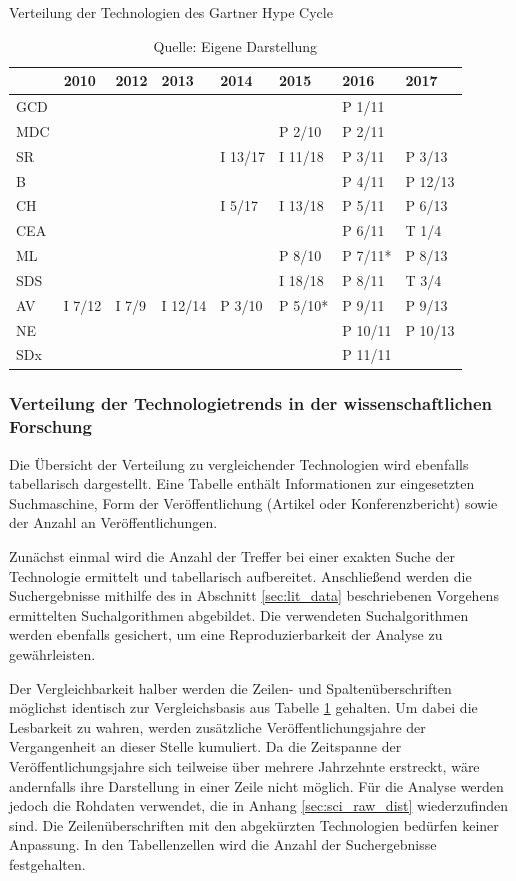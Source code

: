 \begin{table}
	\caption{Verteilung der Technologien des \glqq Gartner Hype Cycle\grqq}
	\centering
	\label{tab:dist_ghc}
\begin{tabularx}{\linewidth}{X|XXXXXXX}
	& 2010 & 2012 & 2013 & 2014 & 2015 & 2016 & 2017 \\
	\hline
	GCD &  &  &  &  &  & P 1/11 &  \\
	\hline
	MDC &  &  &  &  & P 2/10 & P 2/11 &  \\
	\hline
	SR &  &  &  & I 13/17 & I 11/18 & P 3/11 & P 3/13 \\
	\hline
	B &  &  &  &  &  & P 4/11 & P 12/13 \\
	\hline
	CH &  &  &  & I 5/17 & I 13/18 & P 5/11 & P 6/13 \\
	\hline
	CEA &  &  &  &  &  & P 6/11 & T 1/4 \\
	\hline
	ML &  &  &  &  & P 8/10 & P 7/11* & P 8/13 \\
	\hline
	SDS &  &  &  &  & I 18/18 & P 8/11 & T 3/4 \\
	\hline
	AV & I 7/12 & I 7/9 & I 12/14 & P 3/10 & P 5/10* & P 9/11 & P 9/13 \\
	\hline
	NE &  &  &  &  &  & P 10/11 & P 10/13 \\
	\hline
	SDx &  &  &  &  &  & P 11/11 &  \\
\end{tabularx}
\caption*{Quelle: Eigene Darstellung}
\end{table}

\subsubsection{Verteilung der Technologietrends in der wissenschaftlichen Forschung}
Die Übersicht der Verteilung zu vergleichender Technologien wird ebenfalls tabellarisch dargestellt. Eine Tabelle enthält Informationen zur eingesetzten Suchmaschine, Form der Veröffentlichung (Artikel oder Konferenzbericht) sowie der Anzahl an Veröffentlichungen.

Zunächst einmal wird die Anzahl der Treffer bei einer exakten Suche der Technologie ermittelt und tabellarisch aufbereitet. Anschließend werden die Suchergebnisse mithilfe des in Abschnitt \ref{sec:lit_data} beschriebenen Vorgehens ermittelten Suchalgorithmen abgebildet. Die verwendeten Suchalgorithmen werden ebenfalls gesichert, um eine Reproduzierbarkeit der Analyse zu gewährleisten.

Der Vergleichbarkeit halber werden die Zeilen- und Spaltenüberschriften möglichst identisch zur Vergleichsbasis aus Tabelle \ref{tab:dist_ghc} gehalten. Um dabei die Lesbarkeit zu wahren, werden zusätzliche Veröffentlichungsjahre der Vergangenheit an dieser Stelle kumuliert. Da die Zeitspanne der Veröffentlichungsjahre sich teilweise über mehrere Jahrzehnte erstreckt, wäre andernfalls ihre Darstellung in einer Zeile nicht möglich. Für die Analyse werden jedoch die Rohdaten verwendet, die in Anhang \ref{sec:sci_raw_dist} wiederzufinden sind. Die Zeilenüberschriften mit den abgekürzten Technologien bedürfen keiner Anpassung. In den Tabellenzellen wird die Anzahl der Suchergebnisse festgehalten.

